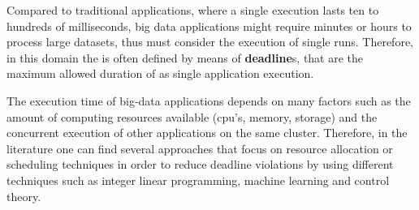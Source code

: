 Compared to traditional applications, where a single execution lasts ten to hundreds of milliseconds, big data applications might require minutes or hours to process large datasets, thus \qos must consider the execution of single runs. Therefore, in this domain the \qos is often defined by means of \textbf{deadline}s, that are the maximum allowed duration of as single application execution. %
 
The execution time of big-data applications depends on many factors such as the amount of computing resources available (cpu's, memory, storage) and the concurrent execution of other applications on the same cluster. Therefore, in the literature one can find several approaches \cite{Verma2011, Hindman2011, Cheng2015} that focus on resource allocation or scheduling techniques in order to reduce deadline violations by using different techniques such as integer linear programming, machine learning and control theory.  %

%

